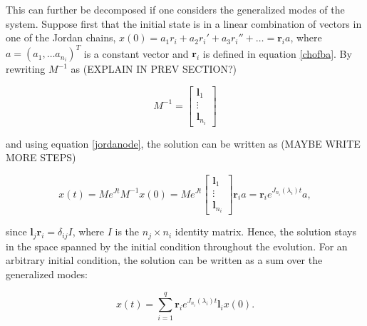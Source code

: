 \documentclass[../main.tex]{subfiles}
\begin{document}
This can further be decomposed if one considers the generalized modes of the system. Suppose first that the initial state is in a linear combination of vectors in one of the Jordan chains, $x(0) = a_1r_i + a_2r_i' + a_3r_i'' + \dots = \boldsymbol{r}_ia$, where $a = (a_1, \dots a_{n_i})^T$ is a constant vector and $\boldsymbol{r}_i$ is defined in equation \ref{chofba}. By rewriting $M^{-1}$ as (EXPLAIN IN PREV SECTION?)


\begin{equation}
    M^{-1} = \begin{bmatrix} \boldsymbol{l}_1 \\ \vdots \\ \boldsymbol{l}_{n_i} \end{bmatrix}
\end{equation}

and using equation \ref{jordanode}, the solution can be written as (MAYBE WRITE MORE STEPS)

\begin{equation}\label{genmode}
    x(t) = Me^{Jt}M^{-1}x(0) = Me^{Jt} \begin{bmatrix} \boldsymbol{l}_1 \\ \vdots \\ \boldsymbol{l}_{n_i} \end{bmatrix} \boldsymbol{r}_ia = \boldsymbol{r}_i e^{J_{n_i}(\lambda_i)t} a,
\end{equation}

since $\boldsymbol{l}_j\boldsymbol{r}_i = \delta_{ij}I$, where $I$ is the $n_j\times n_i$ identity matrix. Hence, the solution stays in the space spanned by the initial condition throughout the evolution. For an arbitrary initial condition, the solution can be written as a sum over the generalized modes: 

\begin{equation}
    x(t) = \sum_{i=1}^q \boldsymbol{r}_i e^{J_{n_i}(\lambda_i)t} \boldsymbol{l}_i x(0).
\end{equation}
\end{document}
